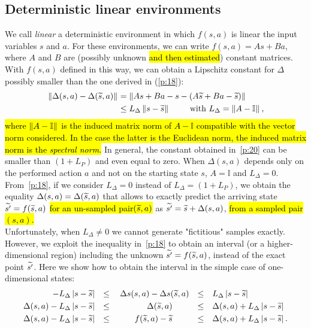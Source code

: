 \subsection{Deterministic linear environments}\label{app:b1}
\noindent We call \textit{linear} a deterministic environment in which $f(s, a)$ is linear \wrt the input variables $s$ and $a$. For these environments, we can write $f(s,a) = As + Ba$, where $A$ and $B$ are (possibly unknown \hl{and then estimated}) constant matrices. With $f(s,a)$ defined in this way, we can obtain a Lipschitz constant for $\Delta$ possibly smaller than the one derived in (\ref{p:18}):
\begin{align}
\left\|\Delta(s,a)-\Delta(\widetilde{s},a)\right\|_{} &= \left\|As+Ba-s - \left(A\widetilde{s}+Ba-\widetilde{s}\right)\right\|_{} \nonumber \\
&\leq L_{\Delta} \left\|s-\widetilde{s}\right\|_{} \qquad \text{ with } L_{\Delta}=\left\|A-\mathbb{I}\right\|_{}, \label{p:20}
\end{align}
\hl{where $\left\|A-\mathbb{I}\right\|_{}$ is the induced matrix norm of $A-\mathbb{I}$ compatible with the vector norm considered. In the case the latter is the Euclidean norm, the induced matrix norm is the \emph{spectral norm.}}
In general, the constant obtained in~\eqref{p:20} can be smaller than $\left(1 + L_{P}\right)$ and even equal to zero. When $\Delta(s,a)$ depends only on the performed action $a$ and not on the starting state $s$,  $A=\mathbb{I}$ and $L_{\Delta}=0$. From~\eqref{p:18}, if we consider $L_{\Delta} = 0$ instead of $L_{\Delta} = \left(1 + L_{P}\right)$, we obtain the equality $\Delta(s,a) = \Delta(\widetilde{s}, a)$ that allows to exactly predict the arriving state $\widetilde{s'}=f(\widetilde{s}, a)$ \hl{for an un-sampled pair$(\widetilde{s}, a)$} as $\widetilde{s'} = \widetilde{s} + \Delta(s,a)$, \hl{from a sampled pair $(s,a)$.}\\
\newline
Unfortunately, when $L_{\Delta} \neq 0$ we cannot generate "fictitious" samples exactly. However, we exploit the inequality in~\eqref{p:18} to obtain an interval (or a higher-dimensional region) including the unknown $\widetilde{s'}=f(\widetilde{s},a)$, instead of the exact point $\widetilde{s'}$. Here we show how to obtain the interval in the simple case of one-dimensional states:
\begin{align}
-L_{\Delta} \left|s - \wt{s}\right| &&\leq&& \Delta s (s,a) - \Delta s (\wt{s},a) &&\leq&& &L_{\Delta} \left|s - \wt{s}\right| \nonumber\\
%
\Delta(s,a) - L_{\Delta} \left|s - \wt{s}\right| &&\leq&& \qquad \Delta(\wt{s},a) \qquad &&\leq&& &\Delta(s,a) + L_{\Delta} \left|s - \wt{s}\right| \nonumber\\
%
\Delta(s,a) - L_{\Delta} \left|s - \wt{s}\right| &&\leq&& \qquad f(\wt{s},a) - \wt{s} \qquad &&\leq&& &\Delta(s,a) + L_{\Delta} \left|s - \wt{s}\right|. \label{p:19}
\end{align}
